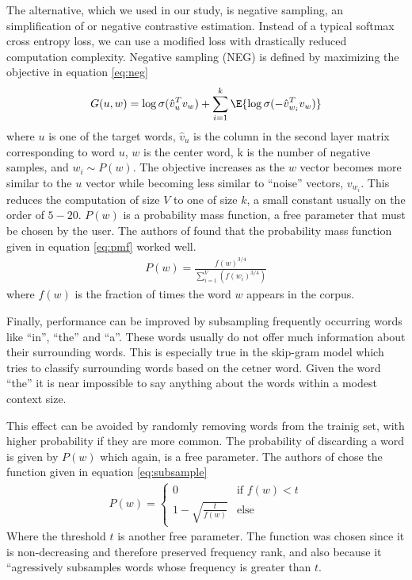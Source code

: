 The alternative, which we used in our study, is negative sampling, an simplification of  or negative contrastive estimation. \cite{mg12} Instead of a typical softmax cross entropy loss,  we can use a modified loss with drastically reduced computation complexity.  Negative sampling (NEG) is defined by maximizing the objective in equation \ref{eq:neg}
\begin{align}\label{eq:neg}
G(u,w) = \log \sigma (\hat{v}_u^Tv_w) + \sum_{i=1}^{k} \E{\log\sigma(-\hat{v}_{w_i}^Tv_w)}
\end{align}
where $u$ is one of the target words, $\hat{v}_u$ is the column in the second layer matrix corresponding to word $u$, $w$ is the center word, k is the number of negative samples, and $w_i \sim P(w)$.  The objective increases as the $w$ vector becomes more similar to the $u$ vector while becoming less similar to ``noise'' vectors, $v_{w_i}$.  This reduces the computation of size $V$ to one of size $k$, a small constant usually on the order of $5-20$.  $P(w)$ is a probability mass function, a free parameter that must be chosen by the user.  The authors of \cite{tm13} found that the probability mass function given in equation \ref{eq:pmf} worked well.
\begin{align}\label{eq:pmf}
P(w) = \frac{f(w)^{3/4}}{\sum_{i=1}^V(f(w_i)^{3/4})}
\end{align}
where $f(w)$ is the fraction of times the word $w$ appears in the corpus.  

Finally, performance can be improved by subsampling frequently occurring words like ``in'', ``the'' and ``a''.  These words usually do not offer much information about their surrounding words.  This is especially true in the skip-gram model which tries to classify surrounding words based on the cetner word.  Given the word ``the'' it is near impossible to say anything about the words within a modest context size.

This effect can be avoided by randomly removing words from the trainig set, with higher probability if they are more common.  The probability of discarding a word is given by $P(w)$ which again, is a free parameter.  The authors of \cite{tm13} chose the function given in equation \ref{eq:subsample}
\begin{align}\label{eq:subsample}
P(w) = 
\begin{cases}
0 & \text{if $f(w) < t$} \\
1 - \sqrt{\frac{t}{f(w)}} & \text{else}
\end{cases}
\end{align}
Where the threshold $t$ is another free parameter.  The function was chosen since it is non-decreasing and therefore preserved frequency rank, and also because it ``agressively subsamples words whose frequency is greater than $t$. \cite{tm13}
